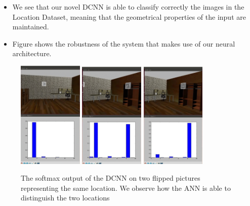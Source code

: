 \documentclass[a0, portrait]{IWIposter}
\begin{document}
\begin{multicols}{3}
\begin{itemize}
\item We see that our novel DCNN is able to classify correctly the images in the Location Dataset, meaning that the geometrical properties of the input are maintained. 
\item Figure shows the robustness of the system that makes use of our neural architecture. 
\end{itemize}


\begin{figure}
        \includegraphics[width=0.275\textwidth]{position1.png}
        \hfill
        \includegraphics[width=0.275\textwidth]{position2.png}
	\hfill
	\includegraphics[width=0.275\textwidth]{position3.png}
	\caption{The softmax output of the DCNN on two flipped pictures representing the same location. We observe 		  how the ANN is able to distinguish the two locations}
	\label{fig:FlippedExamples}
\end{figure}




\end{multicols}
\end{document}
